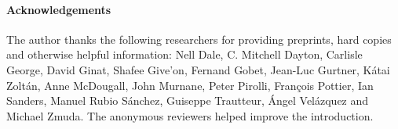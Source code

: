 \documentclass[11pt,a4paper]{article}
\begin{document}
\bigskip

\paragraph{Acknowledgements} The author thanks the following
researchers for providing preprints, hard copies and otherwise helpful
information: Nell Dale, C. Mitchell Dayton, Carlisle George, David
Ginat, Shafee Give'on, Fernand Gobet, Jean\hyp{}Luc Gurtner, K\'atai
Zolt\'an, Anne McDougall, John Murnane, Peter Pirolli, Fran\c{c}ois
Pottier, Ian Sanders, Manuel Rubio S\'anchez, Guiseppe Trautteur,
\'Angel Vel\'azquez and Michael Zmuda. The anonymous reviewers helped
improve the introduction.

%
%
\raggedright\printbibliography
\nocite{*}

\bigskip


\end{document}
